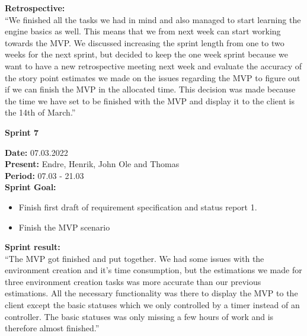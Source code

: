 \textbf{Retrospective:} \\
“We finished all the tasks we had in mind and also managed to start learning the engine basics as well. This means that we from next week can start working towards the MVP. We discussed increasing the sprint length from one to two weeks for the next sprint, but decided to keep the one week sprint because we want to have a new retrospective meeting next week and evaluate the accuracy of the story point estimates we made on the issues regarding the MVP to figure out if we can finish the MVP in the allocated time. This decision was made because the time we have set to be finished with the MVP and display it to the client is the 14th of March.”


\begin{large}
    \textbf{Sprint 7} \\
\end{large}
\textbf{Date:} 07.03.2022 \\ 
\textbf{Present:} Endre, Henrik, John Ole and Thomas \\
\textbf{Period:} 07.03 - 21.03 \\ 

\textbf{Sprint Goal:}
\begin{itemize}
    \item Finish first draft of requirement specification and status report 1.
    \item Finish the MVP scenario
\end{itemize}

\textbf{Sprint result:} \\
“The MVP got finished and put together. We had some issues with the environment creation and it's time consumption, but the estimations we made for three environment creation tasks was more accurate than our previous estimations. All the necessary functionality was there to display the MVP to the client except the basic statuses which we only controlled by a timer instead of an controller. The basic statuses was only missing a few hours of work and is therefore almost finished.”

